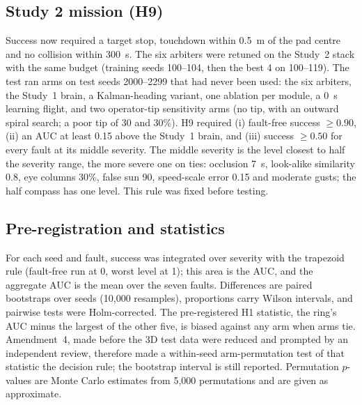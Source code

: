 \documentclass[10pt,twocolumn]{article}
\begin{document}
\subsection{Study 2 mission (H9)}
Success now required a target stop, touchdown within 0.5~m of the pad centre and no collision within 300~s. The six arbiters were retuned on the Study~2 stack with the same budget (training seeds 100--104, then the best 4 on 100--119). The test ran \StwoNarms{} arms on test seeds 2000--2299 that had never been used: the six arbiters, the Study~1 brain, a Kalman-heading variant, one ablation per module, a 0~s learning flight, and two operator-tip sensitivity arms (no tip, with an outward spiral search; a poor tip of 30\textdegree{} and 30\%). H9 required (i) fault-free success $\geq 0.90$, (ii) an AUC at least 0.15 above the Study~1 brain, and (iii) success $\geq 0.50$ for every fault at its middle severity. The middle severity is the level closest to half the severity range, the more severe one on ties: occlusion 7~s, look-alike similarity 0.8, eye columns 30\%, false sun 90\textdegree, speed-scale error 0.15 and moderate gusts; the half compass has one level. This rule was fixed before testing.

\subsection{Pre-registration and statistics}
For each seed and fault, success was integrated over severity with the trapezoid rule (fault-free run at 0, worst level at 1); this area is the AUC, and the aggregate AUC is the mean over the seven faults. Differences are paired bootstraps over seeds (10,000 resamples), proportions carry Wilson intervals, and pairwise tests were Holm-corrected. The pre-registered H1 statistic, the ring's AUC minus the largest of the other five, is biased against any arm when arms tie. Amendment~4, made before the 3D test data were reduced and prompted by an independent review, therefore made a within-seed arm-permutation test of that statistic the decision rule; the bootstrap interval is still reported. Permutation $p$-values are Monte Carlo estimates from 5,000 permutations and are given as approximate.
\end{document}
